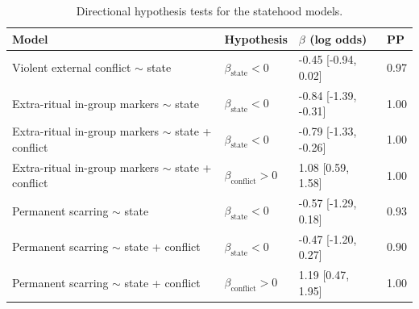 \begin{table}[!ht]
\centering
\small
\caption{Directional hypothesis tests for the statehood models.}
\label{tab:state_hypothesis}
\begin{tabular}{p{5.5cm}lll}
\toprule
Model & Hypothesis & $\beta$ (log odds) & PP \\
\midrule
Violent external conflict $\sim$ state & $\beta_{\mathrm{state}} < 0$ & -0.45 [-0.94, 0.02] & 0.97 \\
Extra-ritual in-group markers $\sim$ state & $\beta_{\mathrm{state}} < 0$ & -0.84 [-1.39, -0.31] & 1.00 \\
Extra-ritual in-group markers $\sim$ state + conflict & $\beta_{\mathrm{state}} < 0$ & -0.79 [-1.33, -0.26] & 1.00 \\
Extra-ritual in-group markers $\sim$ state + conflict & $\beta_{\mathrm{conflict}} > 0$ & 1.08 [0.59, 1.58] & 1.00 \\
Permanent scarring $\sim$ state & $\beta_{\mathrm{state}} < 0$ & -0.57 [-1.29, 0.18] & 0.93 \\
Permanent scarring $\sim$ state + conflict & $\beta_{\mathrm{state}} < 0$ & -0.47 [-1.20, 0.27] & 0.90 \\
Permanent scarring $\sim$ state + conflict & $\beta_{\mathrm{conflict}} > 0$ & 1.19 [0.47, 1.95] & 1.00 \\
\bottomrule
\end{tabular}
\end{table}